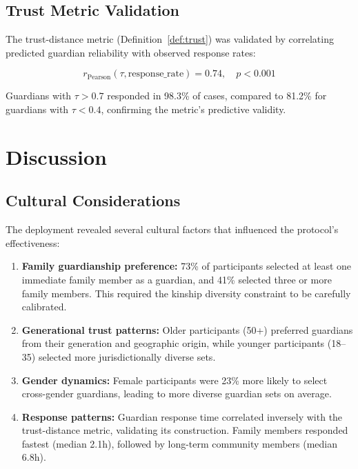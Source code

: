 \documentclass[11pt,a4paper,twocolumn]{article}
\begin{document}
\subsection{Trust Metric Validation}

The trust-distance metric (Definition~\ref{def:trust}) was validated by correlating predicted guardian reliability with observed response rates:

\begin{equation}
  r_{\text{Pearson}}(\tau, \text{response\_rate}) = 0.74, \quad p < 0.001
\end{equation}

Guardians with $\tau > 0.7$ responded in 98.3\% of cases, compared to 81.2\% for guardians with $\tau < 0.4$, confirming the metric's predictive validity.

\section{Discussion}\label{sec:discussion}

\subsection{Cultural Considerations}

The deployment revealed several cultural factors that influenced the protocol's effectiveness:

\begin{enumerate}
  \item \textbf{Family guardianship preference:} 73\% of participants selected at least one immediate family member as a guardian, and 41\% selected three or more family members. This required the kinship diversity constraint to be carefully calibrated.
  \item \textbf{Generational trust patterns:} Older participants (50+) preferred guardians from their generation and geographic origin, while younger participants (18--35) selected more jurisdictionally diverse sets.
  \item \textbf{Gender dynamics:} Female participants were 23\% more likely to select cross-gender guardians, leading to more diverse guardian sets on average.
  \item \textbf{Response patterns:} Guardian response time correlated inversely with the trust-distance metric, validating its construction. Family members responded fastest (median 2.1h), followed by long-term community members (median 6.8h).
\end{enumerate}
\end{document}
